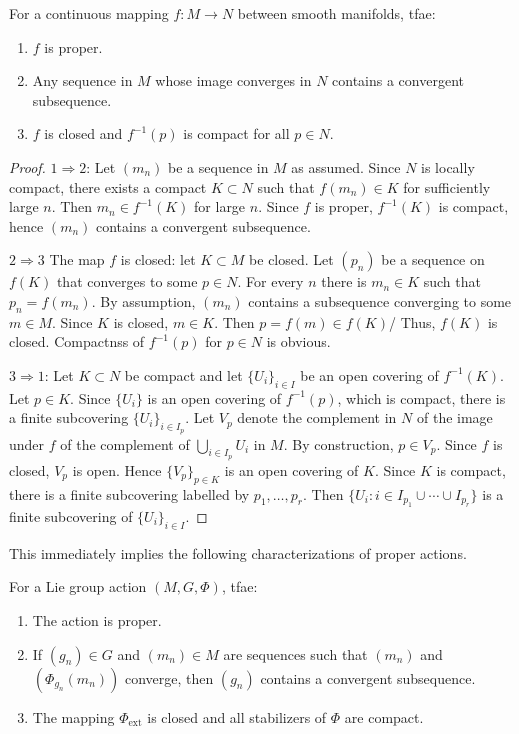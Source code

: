 \begin{lem}[{{\cite[Lem.~6.3.2]{RS1}}}]\label{lem 6.3.2 RS1}
    For a continuous mapping $f:M\to N$ between smooth manifolds, \gls{tfae}:
    \begin{enumerate}
        \item $f$ is proper.
        \item Any sequence in $M$ whose image converges in $N$ contains a convergent subsequence.
        \item $f$ is closed and $f^{-1}(p)$ is compact for all $p\in N$.
    \end{enumerate}
\end{lem}
\begin{proof}
    $1\Rightarrow2$: Let $(m_n)$ be a sequence in $M$ as assumed. Since $N$ is locally compact, there exists a compact $K\subset N$ such that $f(m_n)\in K$ for sufficiently large $n$. Then $m_n\in f^{-1}(K)$ for large $n$. Since $f$ is proper, $f^{-1}(K)$ is compact, hence $(m_n)$ contains a convergent subsequence.

    $2\Rightarrow3$ The map $f$ is closed: let $K\subset M$ be closed. Let $(p_n)$ be a sequence on $f(K)$ that converges to some $p\in N$. For every $n$ there is $m_n\in K$ such that $p_n=f(m_n)$. By assumption, $(m_n)$ contains a subsequence converging to some $m\in M$. Since $K$ is closed, $m\in K$. Then $p=f(m)\in f(K)$/ Thus, $f(K)$ is closed. Compactnss of $f^{-1}(p)$ for $p\in N$ is obvious.

    $3\Rightarrow1$: Let $K\subset N$ be compact and let $\{U_i\}_{i\in I}$ be an open covering of $f^{-1}(K)$. Let $p\in K$. Since $\{U_i\}$ is an open covering of $f^{-1}(p)$, which is compact, there is a finite subcovering $\{U_i\}_{i\in I_p}$. Let $V_p$ denote the complement in $N$ of the image under $f$ of the complement of $\bigcup_{i\in I_p}U_i$ in $M$. By construction, $p\in V_p$. Since $f$ is closed, $V_p$ is open. Hence $\{V_p\}_{p\in K}$ is an open covering of $K$. Since $K$ is compact, there is a finite subcovering labelled by $p_1,\ldots,p_r$. Then $\{U_i:i\in I_{p_1}\cup \cdots \cup I_{p_r}\}$ is a finite subcovering of $\{U_i\}_{i\in I}$.
\end{proof}

This immediately implies the following characterizations of proper actions.

\begin{cor}[{{\cite[Cor.~6.3.3]{RS1}}}]\label{cor 6.3.3 RS1}
    For a Lie group action $(M,G,\Phi)$, \gls{tfae}:
    \begin{enumerate}
        \item The action is proper.
        \item If $(g_n)\in G$ and $(m_n)\in M$ are sequences such that $(m_n)$ and $(\Phi_{g_n}(m_n))$ converge, then $(g_n)$ contains a convergent subsequence.
        \item The mapping $\Phi_{\mathrm{ext}}$ is closed and all stabilizers of $\Phi$ are compact.
    \end{enumerate}
\end{cor}

